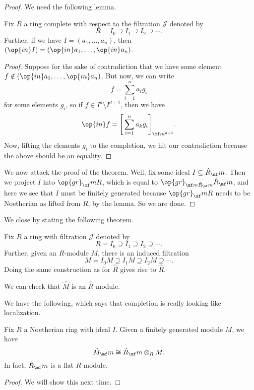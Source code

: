 \begin{proof}
	We need the following lemma.
	\begin{lemma}
		Fix $R$ a ring complete with respect to the filtration $\mathcal J$ denoted by
		\[R=I_0\supseteq I_1\supseteq I_2\supseteq\cdots.\]
		Further, if we have $I=(a_1,\ldots,a_n)$, then $(\op{in}I)=(\op{in}a_1,\ldots,\op{in}a_n)$.
	\end{lemma}
	\begin{proof}
		Suppose for the sake of contradiction that we have some element $f\notin(\op{in}a_1,\ldots,\op{in}a_n)$. But now, we can write
		\[f=\sum_{i=1}^na_ig_i\]
		for some elements $g_i$, so if $f\in I^d\setminus I^{d+1}$, then we have
		\[\op{in}f=\Bigg[\sum_{i=1}^na_kg_i\Bigg]_{\mf m^{d+1}}.\]
		Now, lifting the elements $g_i$ to the completion, we hit our contradiction because the above should be an equality.
	\end{proof}
	We now attack the proof of the theorem. Well, fix some ideal $I\subseteq\hat R_\mf m$. Then we project $I$ into $\op{gr}_\mf mR$, which is equal to $\op{gr}_{\mf m\hat R_\mf m}\hat R_\mf m$, and here we see that $I$ must be finitely generated because $\op{gr}_\mf mR$ needs to be Noetherian as lifted from $R$, by the lemma. So we are done.
\end{proof}
We close by stating the following theorem.
\begin{definition}
	Fix $R$ a ring with filtration $\mathcal J$ denoted by
	\[R=I_0\supseteq I_1\supseteq I_2\supseteq\cdots.\]
	Further, given an $R$-module $M$, there is an induced filtration
	\[M=I_0M\supseteq I_1M\supseteq I_2M\supseteq\cdots.\]
	Doing the same construction as for $\hat R$ gives rise to $\hat R$.
\end{definition}
We can check that $\hat M$ is an $\hat R$-module.

We have the following, which says that completion is really looking like localization.
\begin{theorem}
	Fix $R$ a Noetherian ring with ideal $I$. Given a finitely generated module $M$, we have
	\[\hat M_\mf m\cong\hat R_\mf m\otimes_RM.\]
	In fact, $\hat R_\mf m$ is a flat $R$-module.
\end{theorem}
\begin{proof}
	We will show this next time.
\end{proof}